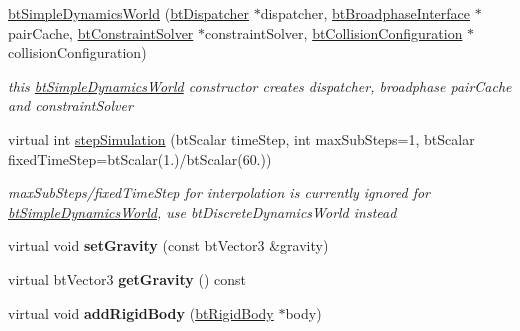 \begin{DoxyCompactItemize}
\item 
\hypertarget{classbt_simple_dynamics_world_a7a82e6d27693ee39d4d2cdf44788ecc8}{\hyperlink{classbt_simple_dynamics_world_a7a82e6d27693ee39d4d2cdf44788ecc8}{bt\+Simple\+Dynamics\+World} (\hyperlink{classbt_dispatcher}{bt\+Dispatcher} $\ast$dispatcher, \hyperlink{classbt_broadphase_interface}{bt\+Broadphase\+Interface} $\ast$pair\+Cache, \hyperlink{classbt_constraint_solver}{bt\+Constraint\+Solver} $\ast$constraint\+Solver, \hyperlink{classbt_collision_configuration}{bt\+Collision\+Configuration} $\ast$collision\+Configuration)}\label{classbt_simple_dynamics_world_a7a82e6d27693ee39d4d2cdf44788ecc8}

\begin{DoxyCompactList}\small\item\em this \hyperlink{classbt_simple_dynamics_world}{bt\+Simple\+Dynamics\+World} constructor creates dispatcher, broadphase pair\+Cache and constraint\+Solver \end{DoxyCompactList}\item 
virtual int \hyperlink{classbt_simple_dynamics_world_af6b4810b5018cbaf09f82839111a243d}{step\+Simulation} (bt\+Scalar time\+Step, int max\+Sub\+Steps=1, bt\+Scalar fixed\+Time\+Step=bt\+Scalar(1.)/bt\+Scalar(60.))
\begin{DoxyCompactList}\small\item\em max\+Sub\+Steps/fixed\+Time\+Step for interpolation is currently ignored for \hyperlink{classbt_simple_dynamics_world}{bt\+Simple\+Dynamics\+World}, use bt\+Discrete\+Dynamics\+World instead \end{DoxyCompactList}\item 
\hypertarget{classbt_simple_dynamics_world_aceee449dd68d64f0a90e853c929bf6d3}{virtual void {\bfseries set\+Gravity} (const bt\+Vector3 \&gravity)}\label{classbt_simple_dynamics_world_aceee449dd68d64f0a90e853c929bf6d3}

\item 
\hypertarget{classbt_simple_dynamics_world_a760417f1d9455c8350b95c3d0158f9fb}{virtual bt\+Vector3 {\bfseries get\+Gravity} () const }\label{classbt_simple_dynamics_world_a760417f1d9455c8350b95c3d0158f9fb}

\item 
\hypertarget{classbt_simple_dynamics_world_a7c6178205587e7a36f5a7082db16b3a2}{virtual void {\bfseries add\+Rigid\+Body} (\hyperlink{classbt_rigid_body}{bt\+Rigid\+Body} $\ast$body)}\label{classbt_simple_dynamics_world_a7c6178205587e7a36f5a7082db16b3a2}


\end{DoxyCompactItemize}
